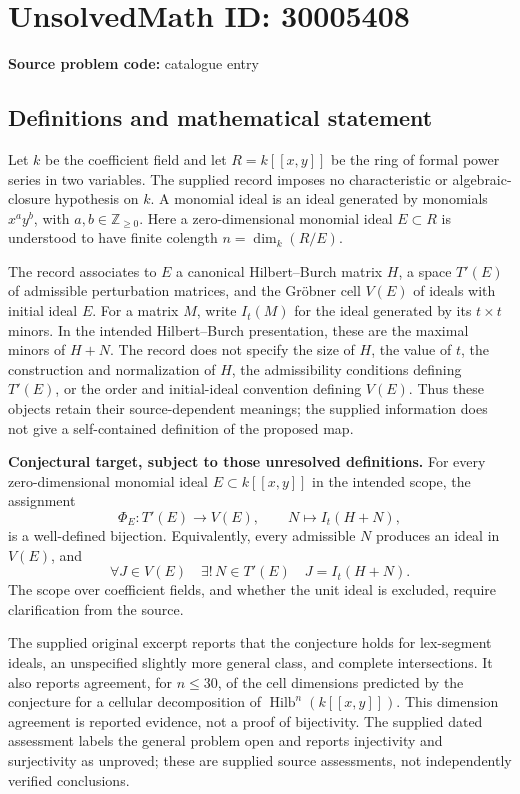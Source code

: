 \documentclass[11pt]{article}
\newcommand{\Z}{\mathbb{Z}}
\begin{document}
\section*{UnsolvedMath ID: 30005408}
\textbf{Source problem code:} catalogue entry
\subsection{Definitions and mathematical statement}
Let \(k\) be the coefficient field and let \(R=k[[x,y]]\) be the ring of formal power series in two variables. The supplied record imposes no characteristic or algebraic-closure hypothesis on \(k\). A monomial ideal is an ideal generated by monomials \(x^a y^b\), with \(a,b\in\Z_{\geq 0}\). Here a zero-dimensional monomial ideal \(E\subset R\) is understood to have finite colength \(n=\dim_k(R/E)\).

The record associates to \(E\) a canonical Hilbert--Burch matrix \(H\), a space \(T'(E)\) of admissible perturbation matrices, and the Gr\"obner cell \(V(E)\) of ideals with initial ideal \(E\). For a matrix \(M\), write \(I_t(M)\) for the ideal generated by its \(t\times t\) minors. In the intended Hilbert--Burch presentation, these are the maximal minors of \(H+N\). The record does not specify the size of \(H\), the value of \(t\), the construction and normalization of \(H\), the admissibility conditions defining \(T'(E)\), or the order and initial-ideal convention defining \(V(E)\). Thus these objects retain their source-dependent meanings; the supplied information does not give a self-contained definition of the proposed map.

\textbf{Conjectural target, subject to those unresolved definitions.} For every zero-dimensional monomial ideal \(E\subset k[[x,y]]\) in the intended scope, the assignment
\[
\Phi_E:T'(E)\longrightarrow V(E),\qquad N\longmapsto I_t(H+N),
\]
is a well-defined bijection. Equivalently, every admissible \(N\) produces an ideal in \(V(E)\), and
\[
\forall J\in V(E)\quad \exists!\,N\in T'(E)\quad J=I_t(H+N).
\]
The scope over coefficient fields, and whether the unit ideal is excluded, require clarification from the source.

The supplied original excerpt reports that the conjecture holds for lex-segment ideals, an unspecified slightly more general class, and complete intersections. It also reports agreement, for \(n\leq 30\), of the cell dimensions predicted by the conjecture for a cellular decomposition of \(\operatorname{Hilb}^{n}(k[[x,y]])\). This dimension agreement is reported evidence, not a proof of bijectivity. The supplied dated assessment labels the general problem open and reports injectivity and surjectivity as unproved; these are supplied source assessments, not independently verified conclusions.
\end{document}
